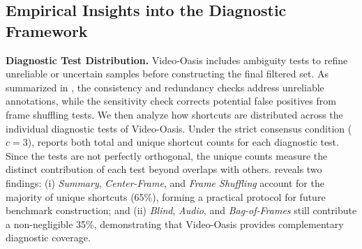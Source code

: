 \documentclass[runningheads]{llncs}
\begin{document}
{    \subsection{Empirical Insights into the Diagnostic Framework}
    \label{sec:3.3}
        \noindent\textbf{Diagnostic Test Distribution.}
        Video-Oasis includes ambiguity tests to refine unreliable or uncertain samples before constructing the final filtered set.
        As summarized in , the consistency and redundancy checks address unreliable annotations, while the sensitivity check corrects potential false positives from frame shuffling tests.
        We then analyze how shortcuts are distributed across the individual diagnostic tests of Video-Oasis.
        Under the strict consensus condition ($c=3$),  reports both total and unique shortcut counts for each diagnostic test.
        Since the tests are not perfectly orthogonal, the unique counts measure the distinct contribution of each test beyond overlaps with others.
         reveals two findings: (i) \textit{Summary}, \textit{Center-Frame}, and \textit{Frame Shuffling} account for the majority of unique shortcuts (65\%), forming a practical protocol for future benchmark construction; and (ii) \textit{Blind}, \textit{Audio}, and \textit{Bag-of-Frames} still contribute a non-negligible 35\%, demonstrating that Video-Oasis provides complementary diagnostic coverage.

}
\end{document}
